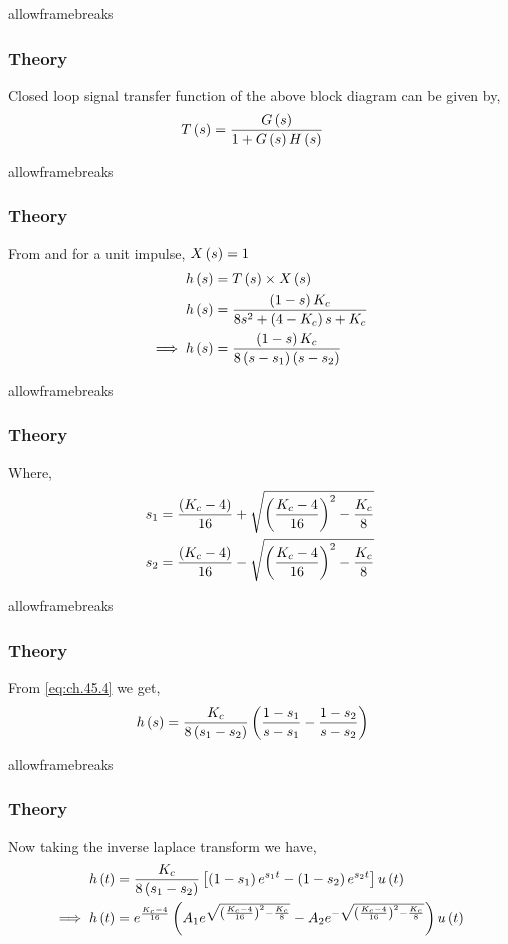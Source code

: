 \documentclass{beamer}
\begin{document}
\begin{frame}{allowframebreaks}
\frametitle{Theory}
Closed loop signal transfer function of the above block diagram can be given by,
\begin{align}
     T\left(s\right) &= \frac{G\left(s\right)}{1+G\left(s\right)H\left(s\right)}    
\end{align}
\end{frame}

\begin{frame}{allowframebreaks}
\frametitle{Theory}
From  and 
for a unit impulse, $X\left(s\right)=1$ \\
\begin{align}
    h\left(s\right) &= T\left(s\right)\times X\left(s\right)   \\
    h\left(s\right) &= \frac{\left(1-s\right)K_c}{8s^2 + \left(4-K_c\right)s + K_c}  \\
    \implies h\left(s\right) &= \frac{\left(1-s\right)K_c}{8\left(s-s_1\right)\left(s-s_2\right)}  \label{eq:ch.45.4}
\end{align}
\end{frame}

\begin{frame}{allowframebreaks}
\frametitle{Theory}
Where,
\begin{align}
    s_1 &= \frac{\left(K_c-4\right)}{16} + \sqrt{\left(\frac{K_c-4}{16}\right)^2 - \frac{K_c}{8}}  \\
    s_2 &= \frac{\left(K_c-4\right)}{16} - \sqrt{\left(\frac{K_c-4}{16}\right)^2 - \frac{K_c}{8}} 
\end{align}
\end{frame}

\begin{frame}{allowframebreaks}
\frametitle{Theory}
From \eqref{eq:ch.45.4} we get,
\begin{align}
    h\left(s\right) &= \frac{K_c}{8\left(s_1-s_2\right)}\left(\frac{1-s_1}{s-s_1}-\frac{1-s_2}{s-s_2}\right)
\end{align}
\end{frame}

\begin{frame}{allowframebreaks}
\frametitle{Theory}
Now taking the inverse laplace transform we have,
\begin{align}
    h\left(t\right) &= \frac{K_c}{8\left(s_1-s_2\right)} \left [\left(1-s_1\right)e^{s_1t}-\left(1-s_2\right)e^{s_2t} \right ]u\left(t\right)  \\
    \implies h\left(t\right) &= e^{\frac{K_c-4}{16}}\left(A_1e^{\sqrt{\left(\frac{K_c-4}{16}\right)^2 - \frac{K_c}{8}}} - A_2e^{-\sqrt{\left(\frac{K_c-4}{16}\right)^2 - \frac{K_c}{8}}}\right)u\left(t\right)    
\end{align}
\end{frame}
\end{document}
